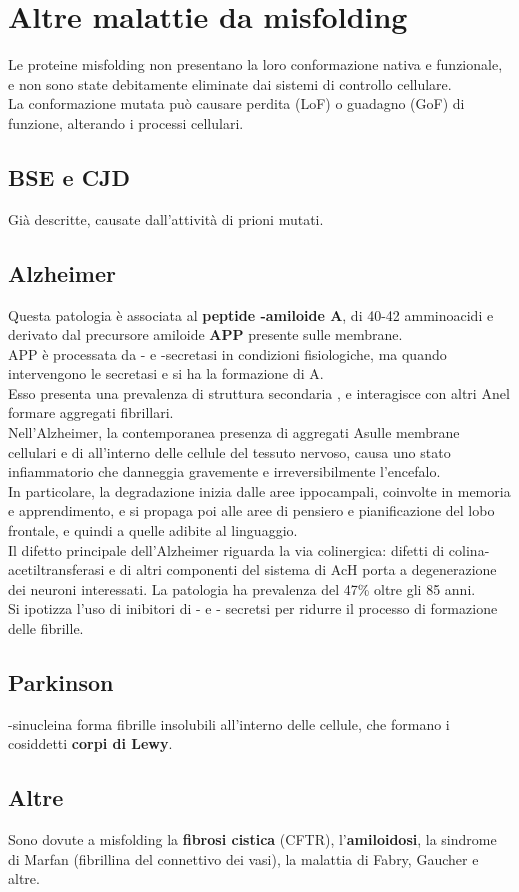 \documentclass[a4paper, 12pt]{article}
\begin{document}
\section{Altre malattie da misfolding}
Le proteine misfolding non presentano la loro conformazione nativa e funzionale, e non sono state debitamente eliminate dai sistemi di controllo cellulare.\\
La conformazione mutata può causare perdita (LoF) o guadagno (GoF) di funzione, alterando i processi cellulari.

\subsection{BSE e CJD}
Già descritte, causate dall'attività di prioni mutati.

\subsection{Alzheimer}
Questa patologia è associata al \textbf{peptide \textbeta-amiloide A\textbeta}, di 40-42 amminoacidi e derivato dal precursore amiloide \textbf{APP} presente sulle membrane.\\
APP è processata da \textalpha- e \textgamma-secretasi in condizioni fisiologiche, ma quando intervengono le secretasi \textbeta e \textgamma si ha la formazione di A\textbeta.\\
Esso presenta una prevalenza di struttura secondaria \textbeta, e interagisce con altri A\textbeta nel formare aggregati fibrillari.\\
Nell'Alzheimer, la contemporanea presenza di aggregati A\textbeta sulle membrane cellulari e di \texttau all'interno delle cellule del tessuto nervoso, causa uno stato infiammatorio che danneggia gravemente e irreversibilmente l'encefalo.\\
In particolare, la degradazione inizia dalle aree ippocampali, coinvolte in memoria e apprendimento, e si propaga poi alle aree di pensiero e pianificazione del lobo frontale, e quindi a quelle adibite al linguaggio.\\
Il difetto principale dell'Alzheimer riguarda la via colinergica: difetti di colina-acetiltransferasi e di altri componenti del sistema di AcH porta a degenerazione dei neuroni interessati. La patologia ha prevalenza del 47\% oltre gli 85 anni.\\
Si ipotizza l'uso di inibitori di \textbeta- e \textgamma- secretsi per ridurre il processo di formazione delle fibrille.

\subsection{Parkinson}
\textalpha-sinucleina forma fibrille insolubili all'interno delle cellule, che formano i cosiddetti \textbf{corpi di Lewy}.

\subsection{Altre}
Sono dovute a misfolding la \textbf{fibrosi cistica} (CFTR), l'\textbf{amiloidosi}, la sindrome di Marfan (fibrillina del connettivo dei vasi), la malattia di Fabry, Gaucher e altre.
\end{document}
